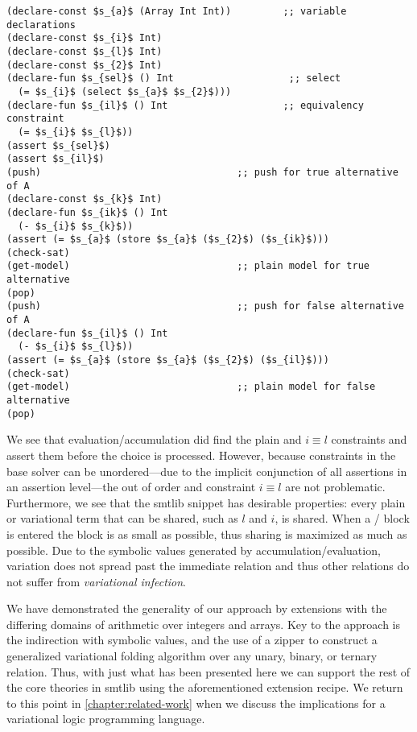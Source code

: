 \begin{lstlisting}[columns=flexible,keepspaces=true,language=SMTLIB,breaklines=true]
(declare-const $s_{a}$ (Array Int Int))         ;; variable declarations
(declare-const $s_{i}$ Int)
(declare-const $s_{l}$ Int)
(declare-const $s_{2}$ Int)
(declare-fun $s_{sel}$ () Int                    ;; select
  (= $s_{i}$ (select $s_{a}$ $s_{2}$)))
(declare-fun $s_{il}$ () Int                    ;; equivalency constraint
  (= $s_{i}$ $s_{l}$))
(assert $s_{sel}$)
(assert $s_{il}$)
(push)                                  ;; push for true alternative of A
(declare-const $s_{k}$ Int)
(declare-fun $s_{ik}$ () Int
  (- $s_{i}$ $s_{k}$))
(assert (= $s_{a}$ (store $s_{a}$ ($s_{2}$) ($s_{ik}$)))
(check-sat)
(get-model)                             ;; plain model for true alternative
(pop)
(push)                                  ;; push for false alternative of A
(declare-fun $s_{il}$ () Int
  (- $s_{i}$ $s_{l}$))
(assert (= $s_{a}$ (store $s_{a}$ ($s_{2}$) ($s_{il}$)))
(check-sat)
(get-model)                             ;; plain model for false alternative
(pop)
\end{lstlisting}
%
We see that evaluation/accumulation did find the plain \select{} and $i \equiv
l$ constraints and assert them before the choice is processed. However, because
constraints in the base solver can be unordered---due to the implicit
conjunction of all assertions in an assertion level---the out of order \select{}
and constraint $i \equiv l$ are not problematic. Furthermore, we see that the
\acl{smtlib} snippet has desirable properties: every plain or variational term
that can be shared, such as $l$ and $i$, is shared. When a /
block is entered the block is as small as possible, thus sharing is maximized as
much as possible. Due to the symbolic values generated by
accumulation/evaluation, variation does not spread past the immediate relation
and thus other relations do not suffer from \emph{variational infection}.

We have demonstrated the generality of our approach by extensions with the
differing domains of arithmetic over integers and arrays. Key to the approach is
the indirection with symbolic values, and the use of a zipper to construct a
generalized variational folding algorithm over any unary, binary, or ternary
relation. Thus, with just what has been presented here we can support the rest
of the core theories in \acl{smtlib} using the aforementioned extension recipe.
We return to this point in \autoref{chapter:related-work} when we discuss the
implications for a variational logic programming language.

